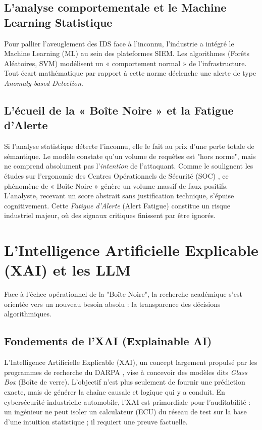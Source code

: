 \documentclass[a4paper, 12pt]{report}
\begin{document}
\subsection{L'analyse comportementale et le Machine Learning Statistique}
Pour pallier l'aveuglement des IDS face à l'inconnu, l'industrie a intégré le Machine Learning (ML) au sein des plateformes SIEM. Les algorithmes (Forêts Aléatoires, SVM) modélisent un « comportement normal » de l'infrastructure. Tout écart mathématique par rapport à cette norme déclenche une alerte de type \textit{Anomaly-based Detection}.

\subsection{L'écueil de la « Boîte Noire » et la Fatigue d'Alerte}
Si l'analyse statistique détecte l'inconnu, elle le fait au prix d'une perte totale de sémantique. Le modèle constate qu'un volume de requêtes est "hors norme", mais ne comprend absolument pas l'\textit{intention} de l'attaquant.
Comme le soulignent les études sur l'ergonomie des Centres Opérationnels de Sécurité (SOC) \cite{hassan_alert_fatigue}, ce phénomène de « Boîte Noire » génère un volume massif de faux positifs. L'analyste, recevant un score abstrait sans justification technique, s'épuise cognitivement. Cette \textit{Fatigue d'Alerte} (Alert Fatigue) constitue un risque industriel majeur, où des signaux critiques finissent par être ignorés.

\section{L'Intelligence Artificielle Explicable (XAI) et les LLM}
\label{sec:xai_llm}

Face à l'échec opérationnel de la "Boîte Noire", la recherche académique s'est orientée vers un nouveau besoin absolu : la transparence des décisions algorithmiques.

\subsection{Fondements de l'XAI (Explainable AI)}
L'Intelligence Artificielle Explicable (XAI), un concept largement propulsé par les programmes de recherche du DARPA \cite{darpa_xai}, vise à concevoir des modèles dits \textit{Glass Box} (Boîte de verre). L'objectif n'est plus seulement de fournir une prédiction exacte, mais de générer la chaîne causale et logique qui y a conduit. En cybersécurité industrielle automobile, l'XAI est primordiale pour l'auditabilité : un ingénieur ne peut isoler un calculateur (ECU) du réseau de test sur la base d'une intuition statistique ; il requiert une preuve factuelle.
\end{document}
